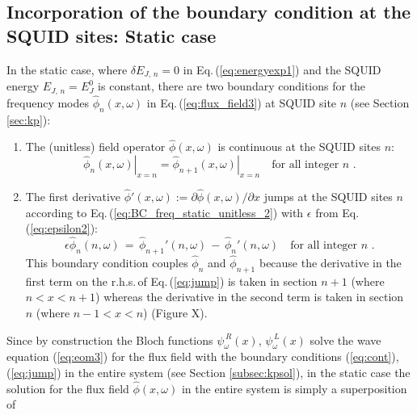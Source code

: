 
\subsection{Incorporation of the boundary condition at the SQUID sites: Static case} 
\label{subsec:bc_static}

\noindent
In the static case, where  $\delta E_{J,\,n} = 0$ in Eq.\,(\ref{eq:energyexp1})
and the SQUID energy $E_{J,\,n} = E_J^0$ is constant, 
there are two boundary conditions for the frequency modes $\hat{\phi}_n(x,\omega)$ 
in Eq.\,(\ref{eq:flux_field3}) at SQUID site $n$ (see Section \ref{sec:kp}):
%
\begin{enumerate}
    \item The (unitless) field operator $\hat{\phi}(x,\omega)$ is continuous at the 
    SQUID sites $n$:
    \begin{equation} \label{eq:cont}
    \left. \hat{\phi}_n(x,\omega) \right|_{x=n} = 
    \left. \hat{\phi}_{n+1}(x,\omega) \right|_{x=n} \quad \text{for all integer} \, \, n \, \, .
    \end{equation}
    \item The first derivative $\hat{\phi}'(x,\omega) := \partial \hat{\phi}(x,\omega) / \partial x$
    jumps at the SQUID sites $n$ 
    according to Eq.\,(\ref{eq:BC_freq_static_unitless_2}) with $\epsilon$ from 
    Eq.\,(\ref{eq:epsilon2}):
    \begin{equation}\label{eq:jump}
    \epsilon \hat{\phi}_n(n, \omega) \, = \, \hat{\phi}_{n+1}'(n,\omega) \, - \, \hat{\phi}_n'(n,\omega) 
    \quad \text{for all integer} \, \, n \, \, .
    \end{equation}
    This boundary condition couples $\hat{\phi}_n$ and $\hat{\phi}_{n+1}$
    because the derivative in the first term on the r.h.s.\,of Eq.\,(\ref{eq:jump}) 
    is taken in section $n+1$ (where $n < x < n+1$)
    whereas the derivative in the second term is taken in section $n$ (where $n-1 < x < n$)
    \color{red}
    (Figure X).
    \color{blue}
\end{enumerate}
%
Since by construction the Bloch functions $\psi_{\omega}^{\,R}(x)$, $\psi_{\omega}^{\,L}(x)$ 
solve the wave equation (\ref{eq:eom3}) for the flux field with the boundary conditions 
(\ref{eq:cont}), (\ref{eq:jump})
in the entire system (see Section \ref{subsec:kpsol}), in the static case 
the solution for the 
flux field $\hat{\phi}(x,\omega)$ in the entire system is simply a superposition of 
